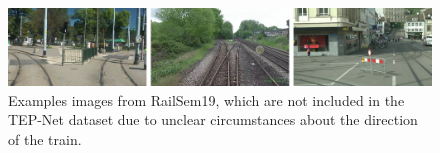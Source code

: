 \begin{figure}[H]
    \centering
    \includegraphics[width=\linewidth]{PICs/datasets/TEP_dataset/TEP-Net dataset bilder aussortiert.png}
    \caption{Examples images from RailSem19, which are not included in the \ac{TEP}-Net dataset due to unclear circumstances about the direction of the train. \cite{tepNet2024}}
    \label{tep-net_aussortiert}
\end{figure}


\begin{figure}[H]
    \centering
    

\end{figure}
